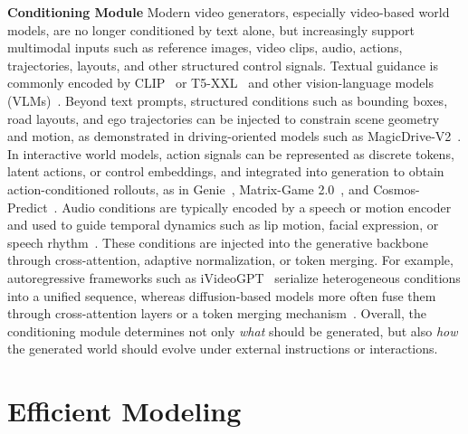 \documentclass[lettersize,journal]{IEEEtran}
\begin{document}
\noindent \textbf{Conditioning Module} Modern video generators, especially video-based world models, are no longer conditioned by text alone, but increasingly support multimodal inputs such as reference images, video clips, audio, actions, trajectories, layouts, and other structured control signals. 
Textual guidance is commonly encoded by CLIP~\cite{radford2021learning} or T5-XXL~\cite{raffel2020exploring} and other vision-language models (VLMs)~\cite{kong2024hunyuanvideo,gao2025seedance,wan2025wan,wu2025hunyuanvideo}.
Beyond text prompts, structured conditions such as bounding boxes, road layouts, and ego trajectories can be injected to constrain scene geometry and motion, as demonstrated in driving-oriented models such as MagicDrive-V2~\cite{gao2025magicdrive}. 
In interactive world models, action signals can be represented as discrete tokens, latent actions, or control embeddings, and integrated into generation to obtain action-conditioned rollouts, as in Genie~\cite{bruce2024genie}, Matrix-Game 2.0~\cite{he2025matrix}, and Cosmos-Predict~\cite{ali2025world}. 
Audio conditions are typically encoded by a speech or motion encoder and used to guide temporal dynamics such as lip motion, facial expression, or speech rhythm~\cite{tian2024emo,li2025ditto, shen2025soulx, yang2025infinitetalkaudiodrivenvideogeneration,zheng2024memo,yi2025magicinfinite}. 
These conditions are injected into the generative backbone through cross-attention, adaptive normalization, or token merging. For example, autoregressive frameworks such as iVideoGPT~\cite{wu2024ivideogpt} serialize heterogeneous conditions into a unified sequence, whereas diffusion-based models more often fuse them through cross-attention layers or a token merging mechanism~\cite{kong2024hunyuanvideo,gao2025seedance}. 
Overall, the conditioning module determines not only \emph{what} should be generated, but also \emph{how} the generated world should evolve under external instructions or interactions.


\section{Efficient Modeling}
\label{sec:efficient_modeling}
\end{document}
